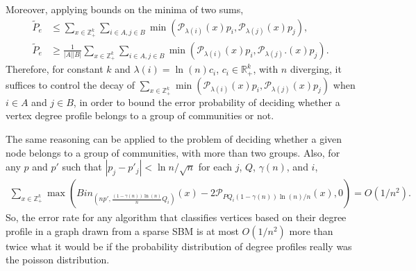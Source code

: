 \documentclass[11pt]{article}
\newcommand{\mR}{\mathbb{R}}
\newcommand{\mZ}{\mathbb{Z}}
\newcommand{\1}{\mathbb{1}}
\begin{document}
Moreover, applying bounds on the minima of two sums,   
\begin{align}
\tilde{P}_e & \leq  \sum_{x \in \mZ_+^k} \sum_{i \in A, j \in B} \min\left(\mathcal{P}_{\lambda(i)}(x) p_{i} ,  \mathcal{P}_{\lambda(j)}(x) p_{j}\right),\\
\tilde{P}_e & \geq  \frac{1}{|A||B|} \sum_{x \in \mZ_+^k} \sum_{i \in A, j \in B} \min\left(\mathcal{P}_{\lambda(i)}(x) p_{i} ,  \mathcal{P}_{\lambda(j)}.(x) p_{j}\right) .
\end{align} 
Therefore, for constant $k$ and $\lambda(i) =  \ln(n) c_i$, $c_i \in \mR_+^k$, with $n$ diverging, it suffices to control the decay of $\sum_{x \in \mZ_+^k}  \min(\mathcal{P}_{\lambda(i)}(x) p_{i} ,  \mathcal{P}_{\lambda(j)}(x) p_{j})$ when $i \in A$ and $j \in B$, in order to bound the error probability of deciding whether a vertex degree profile belongs to a group of communities or not. 

The same reasoning can be applied to the problem of deciding whether a given node belongs to a group of communities, with more than two groups. Also, for any $p$ and $p'$ such that $|p_j-p'_j|<\ln n/\sqrt{n}$ for each $j$, $Q$, $\gamma(n)$, and $i$, 
\begin{align}
\sum_{x\in \mZ_+^k}\max\left(Bin_{\left(np',\frac{(1-\gamma(n))\ln(n)}{n}Q_i\right)}(x)- 2\mathcal{P}_{PQ_i(1-\gamma(n))\ln(n)/n}(x),0\right)=O(1/n^2). \label{bipo} 
\end{align}
So, the error rate for any algorithm that classifies vertices based on their degree profile in a graph drawn from a sparse SBM is at most $O(1/n^2)$ more than twice what it would be if the probability distribution of degree profiles really was the poisson distribution.
\end{document}
